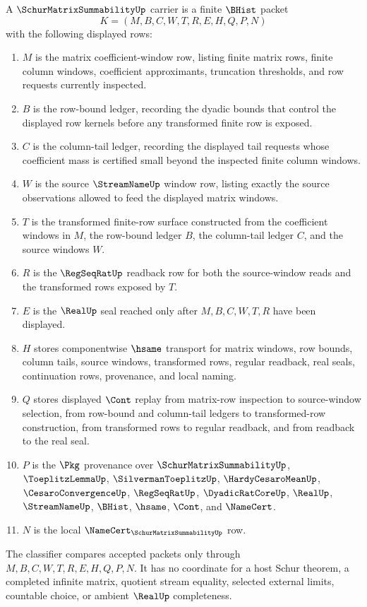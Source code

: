 \begin{definition}\label{def:schur-matrix-summability-carrier}
A $\SchurMatrixSummabilityUp$ carrier is a finite $\BHist$ packet
$$
K=(M,B,C,W,T,R,E,H,Q,P,N)
$$
with the following displayed rows:
\begin{enumerate}
\item $M$ is the matrix coefficient-window row, listing finite matrix rows, finite column windows, coefficient approximants, truncation thresholds, and row requests currently inspected.
\item $B$ is the row-bound ledger, recording the dyadic bounds that control the displayed row kernels before any transformed finite row is exposed.
\item $C$ is the column-tail ledger, recording the displayed tail requests whose coefficient mass is certified small beyond the inspected finite column windows.
\item $W$ is the source $\StreamNameUp$ window row, listing exactly the source observations allowed to feed the displayed matrix windows.
\item $T$ is the transformed finite-row surface constructed from the coefficient windows in $M$, the row-bound ledger $B$, the column-tail ledger $C$, and the source windows $W$.
\item $R$ is the $\RegSeqRatUp$ readback row for both the source-window reads and the transformed rows exposed by $T$.
\item $E$ is the $\RealUp$ seal reached only after $M,B,C,W,T,R$ have been displayed.
\item $H$ stores componentwise $\hsame$ transport for matrix windows, row bounds, column tails, source windows, transformed rows, regular readback, real seals, continuation rows, provenance, and local naming.
\item $Q$ stores displayed $\Cont$ replay from matrix-row inspection to source-window selection, from row-bound and column-tail ledgers to transformed-row construction, from transformed rows to regular readback, and from readback to the real seal.
\item $P$ is the $\Pkg$ provenance over $\SchurMatrixSummabilityUp$, $\ToeplitzLemmaUp$, $\SilvermanToeplitzUp$, $\HardyCesaroMeanUp$, $\CesaroConvergenceUp$, $\RegSeqRatUp$, $\DyadicRatCoreUp$, $\RealUp$, $\StreamNameUp$, $\BHist$, $\hsame$, $\Cont$, and $\NameCert$.
\item $N$ is the local $\NameCert_{\SchurMatrixSummabilityUp}$ row.
\end{enumerate}
The classifier compares accepted packets only through $M,B,C,W,T,R,E,H,Q,P,N$. It has no coordinate for a host Schur theorem, a completed infinite matrix, quotient stream equality, selected external limits, countable choice, or ambient $\RealUp$ completeness.
\end{definition}

